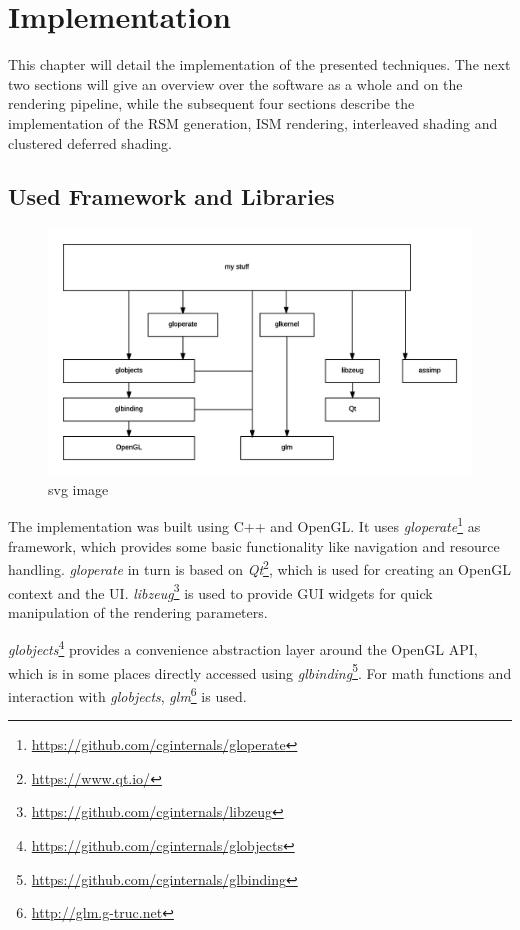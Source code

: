 

\chapter{Implementation}
\label{chap:implementation}

This chapter will detail the implementation of the presented techniques. The next two sections will give an overview over the software as a whole and on the rendering pipeline, while the subsequent four sections describe the implementation of the RSM generation, ISM rendering, interleaved shading and clustered deferred shading.


\section{Used Framework and Libraries}

\begin{figure}[htbp]
  \centering
  \includegraphics{graphics/Architecture}
  \caption{svg image}
\end{figure}

The implementation was built using C++ and OpenGL. It uses \textit{gloperate}\footnote{\url{https://github.com/cginternals/gloperate}} as framework, which provides some basic functionality like navigation and resource handling. \textit{gloperate} in turn is based on \textit{Qt}\footnote{\url{https://www.qt.io/}}, which is used for creating an OpenGL context and the UI. \textit{libzeug}\footnote{\url{https://github.com/cginternals/libzeug}} is used to provide GUI widgets for quick manipulation of the rendering parameters.

\textit{globjects}\footnote{\url{https://github.com/cginternals/globjects}} provides a convenience abstraction layer around the OpenGL API, which is in some places directly accessed using \textit{glbinding}\footnote{\url{https://github.com/cginternals/glbinding}}. For math functions and interaction with \textit{globjects}, \textit{glm}\footnote{\url{http://glm.g-truc.net}} is used.

